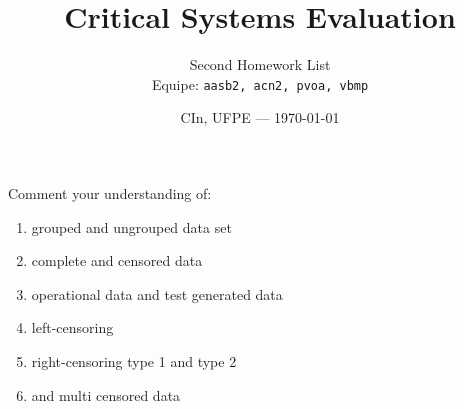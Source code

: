 \documentclass{article}
\title{Critical Systems Evaluation} %
\author{Second Homework List\\ Equipe: \texttt{aasb2, acn2, pvoa, vbmp}} %
\date{CIn, UFPE --- \today} %
\begin{document}
\maketitle %

\begin{question}
    Comment your understanding of:
    \begin{enumerate}[label=(\alph*)]
        \item grouped and ungrouped data set
        \item complete and censored data
        \item  operational data and test generated data
        \item left-censoring
        \item right-censoring type 1 and type 2
        \item and multi censored data
    \end{enumerate}
    \end{question}
\end{document}
